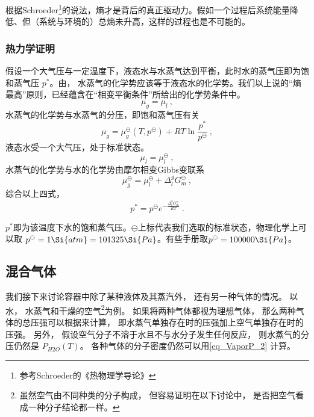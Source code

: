 根据Schroeder\footnote{参考Schroeder的《热物理学导论》}的说法，熵才是背后的真正驱动力。假如一个过程后系统能量降低、但（系统与环境的）总熵未升高，这样的过程也是不可能的。

\subsubsection{热力学证明}
假设一个大气压与一定温度下，液态水与水蒸气达到平衡，此时水的蒸气压即为饱和蒸气压 $p^*$。由， 水蒸气的化学势应该等于液态水的化学势。我们以上说的“熵最高”原则，已经蕴含在“相变平衡条件”所给出的化学势条件中。
$$
\mu_g = \mu_l~,
$$
水蒸气的化学势与水蒸气的分压，即饱和蒸气压有关
$$
\mu_g= \mu_g^\ominus(T,p^\ominus) + RT \ln \frac{p^*}{p^\ominus}~,
$$
液态水受一个大气压，处于标准状态。
$$
\mu_l = \mu_l^\ominus~,
$$
水蒸气的化学势与水的化学势由摩尔相变Gibbs变联系 
$$
\mu_g^\ominus = \mu_l^\ominus + \Delta_l^g G_m^\ominus~,
$$
综合以上四式，
$$p^* = p^\ominus e^{-\frac{\Delta_l^g G_m^\ominus}{RT}}~.$$

$p^*$即为该温度下水的饱和蒸气压。$\ominus$上标代表我们选取的标准状态，物理化学上可以取 $p^\ominus = 1 \Si{atm} = 101325 \Si{Pa}$。有些手册取$p^\ominus = 100000 \Si{Pa}$。





\subsection{混合气体}

我们接下来讨论容器中除了某种液体及其蒸汽外， 还有另一种气体的情况。 以水， 水蒸气和干燥的空气\footnote{虽然空气由不同种类的分子构成， 但容易证明在以下讨论中， 是否把空气看成一种分子结论都一样。}为例。 如果将两种气体都视为理想气体， 那么两种气体的总压强可以根据来计算， 即水蒸气单独存在时的压强加上空气单独存在时的压强。 另外， 假设空气分子不溶于水且不与水分子发生任何反应， 则水蒸气的分压仍然是 $P_{H2O}(T)$。 各种气体的分子密度仍然可以用\autoref{eq_VaporP_2} 计算。

